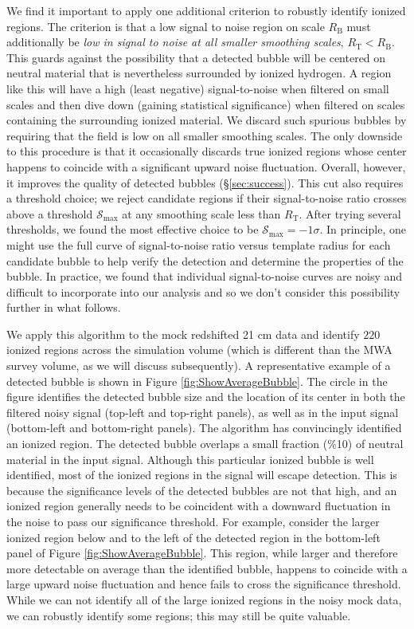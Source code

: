 We find it important to apply one additional criterion to robustly
identify ionized regions. The criterion is that a low signal to noise
region on scale $R_{\text{B}}$ must additionally be {\em low in signal to noise at all smaller smoothing scales},
$R_{\text{T}} < R_{\text{B}}$. This guards against the possibility that a detected
bubble will be centered on neutral material that is nevertheless surrounded by ionized hydrogen. A
region like this will have a high (least negative) signal-to-noise when filtered on small scales
and then dive down (gaining statistical significance) when filtered on scales containing
the surrounding ionized material. We discard such spurious bubbles by requiring
that the field is low on all smaller smoothing scales. The only downside to this
procedure is that it occasionally discards true ionized regions whose center
happens to coincide with a significant upward noise fluctuation. Overall, however, it improves the quality of detected
bubbles (\S \ref{sec:success}). This cut also requires a threshold choice; we
reject candidate regions if their signal-to-noise ratio crosses above a threshold $\mathcal{S}_{\max}$
at any smoothing scale less than $R_{\text{T}}$.
After trying several
thresholds, we found the most effective choice to be $\mathcal{S}_{\max} = -1\sigma$. In principle, one might use the full curve of signal-to-noise ratio
versus template radius for each candidate bubble to help verify the detection and
determine the properties of the bubble. In practice, we found that individual
signal-to-noise curves are noisy and difficult to incorporate into our analysis and
so we don't consider this possibility further in what follows.

We apply this algorithm to the mock redshifted 21 cm data and
identify $220$ ionized regions across the simulation volume (which is different
than the MWA survey volume, as we will discuss subsequently). A representative
example of a detected bubble is shown in Figure \ref{fig:ShowAverageBubble}. The
circle in the figure identifies the detected bubble size and the location
of its center in both the filtered noisy signal (top-left and top-right panels),
as well as in the input signal (bottom-left and bottom-right panels). The
algorithm has convincingly identified an ionized region. The detected bubble overlaps
a small fraction (\%10) of neutral material in the input signal. Although this particular
ionized bubble is well identified, most of the ionized regions in the signal will
escape detection. This is because the significance levels of the detected bubbles are not that 
high, and an ionized region generally needs to be coincident
with a downward fluctuation in the noise to pass our significance threshold. 
For example, consider the larger ionized region below and to the left of the
detected region in the bottom-left panel of Figure \ref{fig:ShowAverageBubble}.
This region, while larger and therefore more detectable on average than the identified bubble,
happens to coincide with a large upward noise fluctuation and hence fails to cross
the significance threshold. While we can not identify all of the large
ionized regions in the noisy mock data, we can robustly identify some regions; this may still
be quite valuable.

